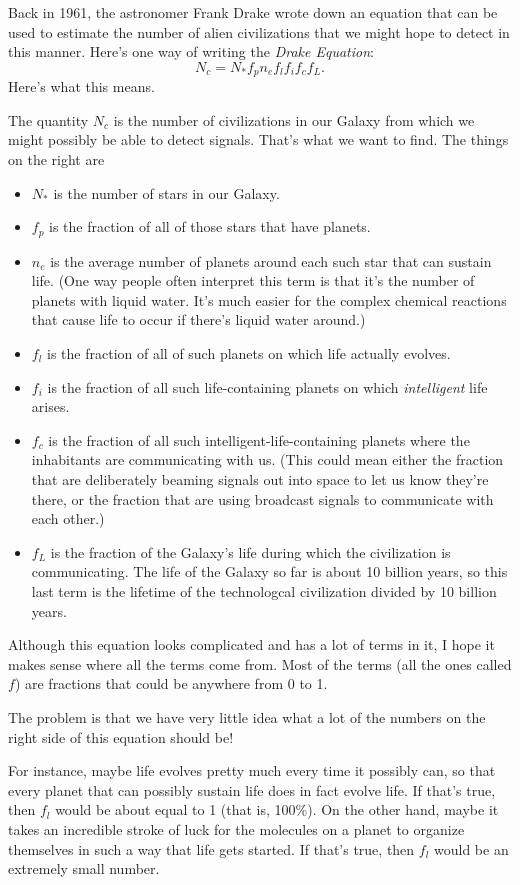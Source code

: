 Back in 1961, the astronomer Frank Drake wrote down an equation that
can be used to estimate the number of alien civilizations that we might
hope to detect in this manner.  Here's one way of writing the {\it
Drake Equation}:
$$
N_c=N_*f_pn_ef_lf_if_cf_L.
$$
Here's what this means.

The quantity $N_c$ is the number of civilizations in our Galaxy
from which we might possibly be able to detect signals.  That's what
we want to find.  The things on the right are
\begin{itemize}
\item $N_*$ is the number of stars in our Galaxy.
\item $f_p$ is the fraction of all of those stars that have planets.
\item $n_e$ is the average number of planets around each such star
that can sustain life.  (One way people often interpret this term
is that it's the number of planets with liquid water.  It's much
easier for the complex chemical reactions that cause life to occur
if there's liquid water around.)
\item $f_l$ is the fraction of all of such planets on which life actually
evolves.
\item $f_i$ is the fraction of all such life-containing planets on which
{\it intelligent} life arises.
\item $f_c$ is the fraction of all such intelligent-life-containing
planets where the inhabitants are communicating with us.  (This could mean
either the fraction that are deliberately beaming signals out into space
to let us know they're there, or the fraction that are using 
broadcast signals to communicate with each other.)
\item $f_L$ is the fraction of the Galaxy's life during which
the civilization is communicating.  The life of the Galaxy so far is
about 10 billion years, so this last term is the lifetime of the
technologcal civilization divided by 10 billion years.
\end{itemize}

Although this equation looks complicated and 
has a lot of terms in it, I hope it makes sense where all the terms come from.
Most of the terms (all the ones called $f$) are fractions that could
be anywhere from 0 to 1.

The problem is that we have very little idea what a lot of the numbers
on the right side of this equation should be!  

For instance, maybe
life evolves pretty much every time it possibly can, so that every
planet that can possibly sustain life does in fact evolve life.
If that's true, then $f_l$ would be about equal to 1 (that is, 100\%).  
On the other hand,
maybe it takes an incredible stroke of luck for the molecules on a planet
to organize themselves in such a way that life gets started.  If that's
true, then $f_l$ would be an extremely small number.

